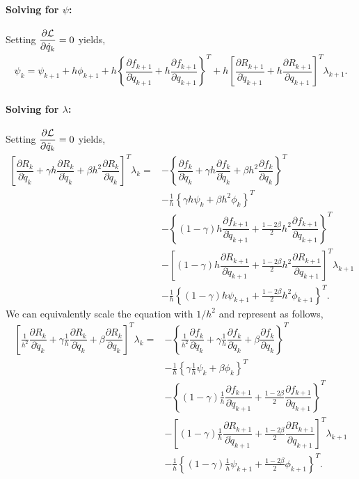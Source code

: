 \documentclass[10pt,letter]{book}
\newcommand{\pd}[2]{\dfrac{\partial #1}{\partial #2}}
\begin{document}
     \paragraph{Solving for $\psi$:} Setting $\pd{\cal{L}}{\dot{q}_k} = 0$ yields,
     \begin{equation}
       \begin{split}
         \psi_k = \psi_{k+1} + h \phi_{k+1} + h \left\{  \pd{f_{k+1}}{\dot{q}_{k+1}} +  h \pd{f_{k+1}}{{q}_{k+1}} \right\}^T 
         + h \left[ \pd{R_{k+1}}{\dot{q}_{k+1}} +  h \pd{R_{k+1}}{{q}_{k+1}} \right]^T \lambda_{k+1}.
       \end{split}
     \end{equation}

     \paragraph{Solving for $\lambda$:} Setting $\pd{\cal{L}}{\ddot{q}_k} = 0$ yields,
     \begin{equation}
       \begin{split}
         \left[ \pd{R_k}{\ddot{q}_k} + \gamma h \pd{R_k}{\dot{q}_k} + \beta h^2 \pd{R_k}{{q}_k} \right]^T \lambda_k = &- \left\{ \pd{f_k}{\ddot{q}_k} + \gamma h \pd{f_k}{\dot{q}_k} + \beta h^2 \pd{f_k}{{q}_k} \right\}^T \\
         & -  \frac{1}{h}\left\{  \gamma h  \psi_k + \beta h^2   \phi_k \right\}^T\\
         & -  \left\{ (1-\gamma) h \pd{f_{k+1}}{\dot{q}_{k+1}} + \frac{1-2\beta}{2} h^2 \pd{f_{k+1}}{{q}_{k+1}} \right\}^T \\
         & -  \left[ (1-\gamma) h \pd{R_{k+1}}{\dot{q}_{k+1}} + \frac{1-2\beta}{2} h^2 \pd{R_{k+1}}{{q}_{k+1}} \right]^T\lambda_{k+1} \\
         & -  \frac{1}{h} \left\{ (1-\gamma) h \psi_{k+1} + \frac{1-2\beta}{2} h^2 \phi_{k+1} \right\}^T.
       \end{split}
     \end{equation}
     We can equivalently scale the equation with $1/h^2$ and represent as follows,
     \begin{equation}
       \begin{split}
         \left[ \frac{1}{h^2} \pd{R_k}{\ddot{q}_k} + \gamma \frac{1}{h} \pd{R_k}{\dot{q}_k} + \beta \pd{R_k}{{q}_k} \right]^T \lambda_k = &- \left\{ \frac{1}{h^2}  \pd{f_k}{\ddot{q}_k} + \gamma \frac{1}{h} \pd{f_k}{\dot{q}_k} + \beta \pd{f_k}{{q}_k} \right\}^T \\
         & -  \frac{1}{h}\left\{  \gamma \frac{1}{h}  \psi_k + \beta   \phi_k \right\}^T\\
         & -  \left\{ (1-\gamma) \frac{1}{h} \pd{f_{k+1}}{\dot{q}_{k+1}} + \frac{1-2\beta}{2} \pd{f_{k+1}}{{q}_{k+1}} \right\}^T \\
         & -  \left[ (1-\gamma) \frac{1}{h} \pd{R_{k+1}}{\dot{q}_{k+1}} + \frac{1-2\beta}{2} \pd{R_{k+1}}{{q}_{k+1}} \right]^T\lambda_{k+1} \\
         & -  \frac{1}{h} \left\{ (1-\gamma) \frac{1}{h} \psi_{k+1} + \frac{1-2\beta}{2} \phi_{k+1} \right\}^T.
       \end{split}
     \end{equation}
\end{document}
